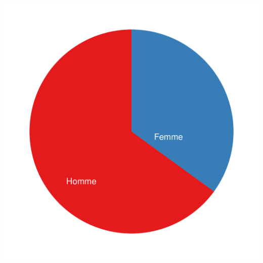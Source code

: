 \documentclass[11pt,a4paper, x11names]{article}\usepackage[]{graphicx}\usepackage[]{color}
\makeatletter
\def\maxwidth{ %
  \ifdim\Gin@nat@width>\linewidth
    \linewidth
  \else
    \Gin@nat@width
  \fi
}
\newenvironment{knitrout}{}{} %
\makeatother
\begin{document}
\begin{knitrout}
\color{fgcolor}
\includegraphics[width=\maxwidth]{figure/unnamed-chunk-9-1} 
\end{knitrout}
\end{document}

